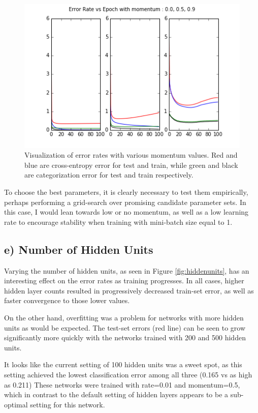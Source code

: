 \documentclass{article}
\begin{document}
\begin{figure}[h]
  \centering
  \includegraphics[scale=0.6]{../momentum_tests.png} 
  \caption{Visualization of error rates with various momentum values. Red and blue are cross-entropy error for test and train, while green and black are categorization error for test and train respectively. }
  \label{fig:momentums}
\end{figure}

To choose the best parameters, it is clearly necessary to test them empirically, perhaps performing a grid-search over promising candidate parameter sets. In this case, I would lean towards low or no momentum, as well as a low learning rate to encourage stability when training with mini-batch size equal to 1.

\subsection{e) Number of Hidden Units}

Varying the number of hidden units, as seen in Figure \ref{fig:hiddenunits}, has an interesting effect on the error rates as training progresses.  In all cases, higher hidden layer counts resulted in progressively decreased train-set error, as well as faster convergence to those lower values. 

On the other hand, overfitting was a problem for networks with more hidden units as would be expected. The test-set errors (red line) can be seen to grow significantly more quickly with the networks trained with 200 and 500 hidden units. 

It looks like the current setting of 100 hidden units was a sweet spot, as this setting achieved the lowest classification error among all three (0.165 vs as high as 0.211) These networks were trained with rate=0.01 and momentum=0.5, which in contrast to the default setting of hidden layers appears to be a sub-optimal setting for this network. 
\end{document}
